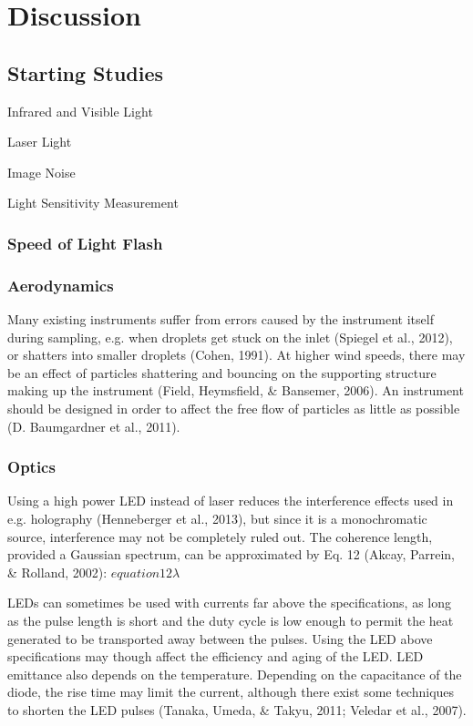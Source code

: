 
\chapter{Discussion}
\label{chap:discussion}

\section{Starting Studies}
Infrared and Visible Light

Laser Light

Image Noise

Light Sensitivity Measurement
\subsection{Speed of Light Flash}

\subsection{Aerodynamics}
Many existing instruments suffer from errors caused by the instrument itself during sampling, e.g. when droplets get stuck on the inlet (Spiegel et al., 2012), or shatters into smaller droplets (Cohen, 1991).
At higher wind speeds, there may be an effect of particles shattering and bouncing on the supporting structure making up the instrument (Field, Heymsfield, \& Bansemer, 2006).
An instrument should be designed in order to affect the free flow of particles as little as possible (D. Baumgardner et al., 2011).


\subsection{Optics}
Using a high power LED instead of laser reduces the interference effects used in e.g. holography (Henneberger et al., 2013), but since it is a monochromatic source, interference may not be completely ruled out. The coherence length, provided a Gaussian spectrum, can be approximated by Eq. 12 (Akcay, Parrein, \& Rolland, 2002): $equation12λ$

LEDs can sometimes be used with currents far above the specifications, as long as the pulse length is short and the duty cycle is low enough to permit the heat generated to be transported away between the pulses. Using the LED above specifications may though affect the efficiency and aging of the LED. LED emittance also depends on the temperature. Depending on the capacitance of the diode, the rise time may limit the current, although there exist some techniques to shorten the LED pulses (Tanaka, Umeda, \& Takyu, 2011; Veledar et al., 2007).



